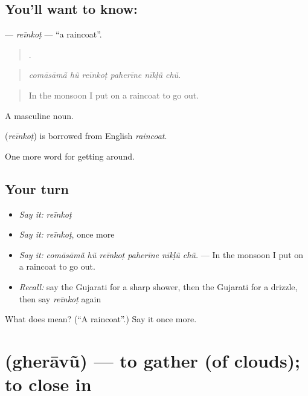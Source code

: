 \subsection*{You'll want to know: }
\textbf{} — \emph{reīnkoṭ} — \textquotedblleft{}a raincoat\textquotedblright{}.

\begin{quote}
     .
\end{quote}

\begin{quote}
\emph{comāsāmā̃ hũ reīnkoṭ paherīne nīkḷũ chũ.}
\end{quote}

\begin{quote}
In the monsoon I put on a raincoat to go out.
\end{quote}

A masculine noun.

\begin{cousinweb}
\textbf{} (\emph{reīnkoṭ}) is borrowed from English \emph{raincoat}.
\end{cousinweb}

\begin{grammarlens}[title={What you've built}]
One more word for getting around.
\end{grammarlens}

\subsection*{Your turn}
\begin{itemize}
\raggedright
  \item \emph{Say it:} \emph{reīnkoṭ}
  \item \emph{Say it:} \emph{reīnkoṭ}, once more
  \item \emph{Say it:} \emph{comāsāmā̃ hũ reīnkoṭ paherīne nīkḷũ chũ.} — In the monsoon I put on a raincoat to go out.
  \item \emph{Recall:} say the Gujarati for a sharp shower, then the Gujarati for a drizzle, then say \emph{reīnkoṭ} again
\end{itemize}

\begin{tcolorbox}[breakable,colback=teal!4,colframe=teal!35!black,title={Before you move on}]
What does  mean? (\textquotedblleft{}A raincoat\textquotedblright{}.) Say it once more.
\end{tcolorbox}
\section[\texorpdfstring{\gu{ઘેરાવું} (gherāvũ)}{ઘેરાવું (gherāvũ)}]{ (gherāvũ) — to gather (of clouds); to close in}

